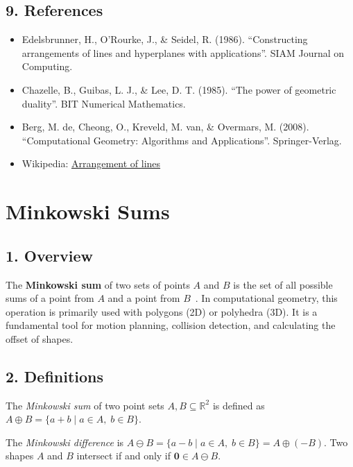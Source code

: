 \subsection{9. References}
\begin{itemize}
    \item Edelsbrunner, H., O'Rourke, J., \& Seidel, R. (1986). ``Constructing arrangements of lines and hyperplanes with applications''. SIAM Journal on Computing.
    \item Chazelle, B., Guibas, L. J., \& Lee, D. T. (1985). ``The power of geometric duality''. BIT Numerical Mathematics.
    \item Berg, M. de, Cheong, O., Kreveld, M. van, \& Overmars, M. (2008). ``Computational Geometry: Algorithms and Applications''. Springer-Verlag.
    \item Wikipedia: \href{https://en.wikipedia.org/wiki/Arrangement_of_lines}{Arrangement of lines}
\end{itemize}

\section{Minkowski Sums}
\label{sec:minkowski_sums}

\subsection{1. Overview}
The \textbf{Minkowski sum} of two sets of points $A$ and $B$ is the set of all possible sums of a point from $A$ and a point from $B$~\cite{lozanoperez1983}. In computational geometry, this operation is primarily used with polygons (2D) or polyhedra (3D). It is a fundamental tool for motion planning, collision detection, and calculating the offset of shapes.

\subsection{2. Definitions}
\begin{definition}
\label{def:ms_sum}
The \emph{Minkowski sum} of two point sets $A, B \subseteq \mathbb{R}^2$ is defined as $A \oplus B = \{a + b \mid a \in A,\; b \in B\}$.
\end{definition}

\begin{definition}
\label{def:ms_diff}
The \emph{Minkowski difference} is $A \ominus B = \{a - b \mid a \in A,\; b \in B\} = A \oplus (-B)$. Two shapes $A$ and $B$ intersect if and only if $\mathbf{0} \in A \ominus B$.
\end{definition}

